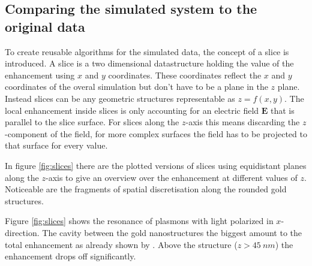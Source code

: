 \subsection{Comparing the simulated system to the original data}

To create reusable algorithms for the simulated data, the concept of a slice is introduced. A slice is a two dimensional datastructure holding the value of the enhancement using $x$ and $y$ coordinates. These coordinates reflect the $x$ and $y$ coordinates of the overal simulation but don't have to be a plane in the $z$ plane. Instead slices can be any geometric structures representable as $z=f(x,y)$. The local enhancement inside slices is only accounting for an electric field $\mathbf{E}$ that is parallel to the slice surface. For slices along the $z$-axis this means discarding the $z$-component of the field, for more complex surfaces the field has to be projected to that surface for every value.

In figure \ref{fig:slices} there are the plotted versions of slices using equidistant planes along the $z$-axis to give an overview over the enhancement at different values of $z$. Noticeable are the fragments of spatial discretisation along the rounded gold structures.

Figure \ref{fig:slices} shows the resonance of plasmons with light polarized in $x$-direction. The cavity between the gold nanostructures the biggest amount to the total enhancement as already shown by \cite{heeg}. Above the structure ($z>\SI{45}{nm}$) the enhancement drops off significantly.
